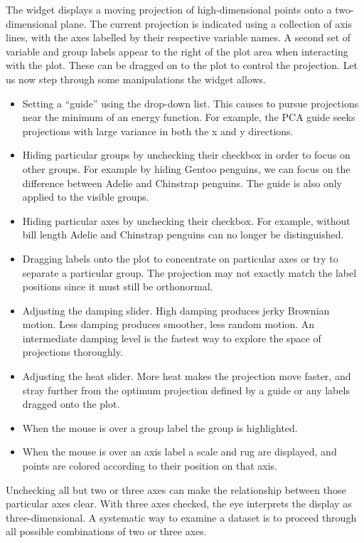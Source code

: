 The widget displays a moving projection of high-dimensional points onto a two-dimensional plane. The current projection is indicated using a collection of axis lines, with the axes labelled by their respective variable names. A second set of variable and group labels appear to the right of the plot area when interacting with the plot. These can be dragged on to the plot to control the projection. Let us now step through some manipulations the  widget allows.

\begin{itemize}
\item
  Setting a ``guide'' using the drop-down list. This causes  to pursue projections near the minimum of an energy function. For example, the PCA guide seeks projections with large variance in both the x and y directions.
\item
  Hiding particular groups by unchecking their checkbox in order to focus on other groups. For example by hiding Gentoo penguins, we can focus on the difference between Adelie and Chinstrap penguins. The guide is also only applied to the visible groups.
\item
  Hiding particular axes by unchecking their checkbox. For example, without bill length Adelie and Chinstrap penguins can no longer be distinguished.
\item
  Dragging labels onto the plot to concentrate on particular axes or try to separate a particular group. The projection may not exactly match the label positions since it must still be orthonormal.
\item
  Adjusting the damping slider. High damping produces jerky Brownian motion. Less damping produces smoother, less random motion. An intermediate damping level is the fastest way to explore the space of projections thoroughly.
\item
  Adjusting the heat slider. More heat makes the projection move faster, and stray further from the optimum projection defined by a guide or any labels dragged onto the plot.
\item
  When the mouse is over a group label the group is highlighted.
\item
  When the mouse is over an axis label a scale and rug are displayed, and points are colored according to their position on that axis.
\end{itemize}

Unchecking all but two or three axes can make the relationship between those particular axes clear. With three axes checked, the eye interprets the display as three-dimensional. A systematic way to examine a dataset is to proceed through all possible combinations of two or three axes.

